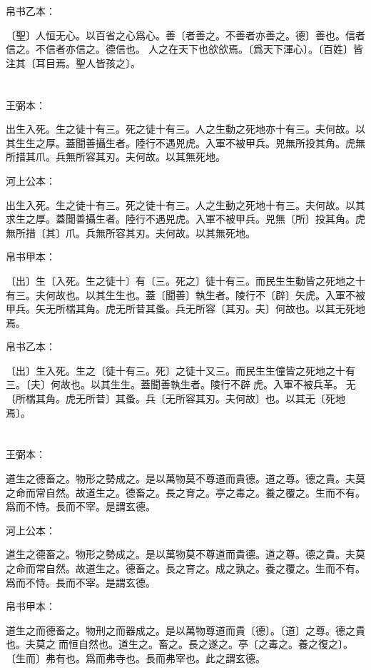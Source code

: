 \documentclass[a5paper]{ctexbook}
\begin{document}
    帛书乙本：

    〔聖〕人恒无心。以百省之心爲心。善〔者善之。不善者亦善之。德〕善也。信者信之。不信者亦信之。德信也。𦔻人之在天下也欱欱焉。〔爲天下渾心〕。〔百姓〕皆注其〔耳目焉。聖人皆孩之〕。

    \chapter{}
    王弼本：

    出生入死。生之徒十有三。死之徒十有三。人之生動之死地亦十有三。夫何故。以其生生之厚。蓋聞善攝生者。陸行不遇兕虎。入軍不被甲兵。兕無所投其角。虎無所措其爪。兵無所容其刃。夫何故。以其無死地。

    河上公本：

    出生入死。生之徒十有三。死之徒十有三。人之生動之死地十有三。夫何故。以其求生之厚。蓋聞善攝生者。陸行不遇兕虎。入軍不被甲兵。兕無〔所〕投其角。虎無所措〔其〕爪。兵無所容其刃。夫何故。以其無死地。

    帛书甲本：

    〔出〕生〔入死。生之徒十〕有〔三。死之〕徒十有三。而民生生動皆之死地之十有三。夫何故也。以其生生也。蓋〔聞善〕執生者。陵行不〔辟〕矢虎。入軍不被甲兵。矢无所椯其角。虎无所昔其蚤。兵无所容〔其刃。夫〕何故也。以其无死地焉。

    帛书乙本：

    〔出〕生入死。生之〔徒十有三。死〕之徒十又三。而民生生僮皆之死地之十有三。〔夫〕何故也。以其生生。蓋聞善執生者。陵行不辟𧰽虎。入軍不被兵革。𧰽无〔所椯其角。虎无所昔〕其蚤。兵〔无所容其刃。夫何故〕也。以其无〔死地焉〕。

    \chapter{}
    王弼本：

    道生之德畜之。物形之勢成之。是以萬物莫不尊道而貴德。道之尊。德之貴。夫莫之命而常自然。故道生之。德畜之。長之育之。亭之毒之。養之覆之。生而不有。爲而不恃。長而不宰。是謂玄德。

    河上公本：

    道生之德畜之。物形之勢成之。是以萬物莫不尊道而貴德。道之尊。德之貴。夫莫之命而常自然。故道生之。德畜之。長之育之。成之孰之。養之覆之。生而不有。爲而不恃。長而不宰。是謂玄德。

    帛书甲本：

    道生之而德畜之。物刑之而器成之。是以萬物尊道而貴〔德〕。〔道〕之尊。德之貴也。夫莫之𡬠而恒自然也。道生之。畜之。長之遂之。亭〔之毒之。養之復之〕。〔生而〕弗有也。爲而弗寺也。長而弗宰也。此之謂玄德。
\end{document}
